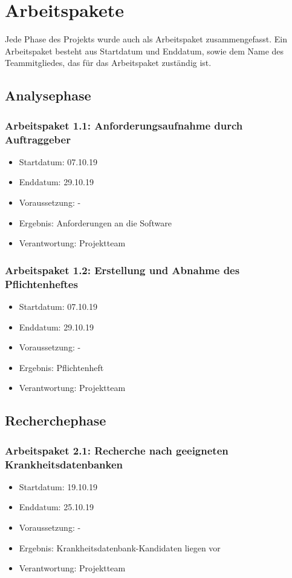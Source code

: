 \section*{Arbeitspakete}
Jede Phase des Projekts wurde auch als Arbeitspaket zusammengefasst. Ein Arbeitspaket besteht aus Startdatum und Enddatum, sowie dem Name des Teammitgliedes, das für das Arbeitspaket zuständig ist. 

\subsection*{Analysephase}
\subsubsection*{Arbeitspaket 1.1: Anforderungsaufnahme durch Auftraggeber}
\begin{itemize}
\item Startdatum: 07.10.19
\item Enddatum: 29.10.19
\item Voraussetzung: -
\item Ergebnis: Anforderungen an die Software
\item Verantwortung: Projektteam
\end{itemize}
\subsubsection*{Arbeitspaket 1.2: Erstellung und Abnahme des Pflichtenheftes}
\begin{itemize}
\item Startdatum: 07.10.19
\item Enddatum: 29.10.19
\item Voraussetzung: -
\item Ergebnis: Pflichtenheft
\item Verantwortung: Projektteam
\end{itemize}
\subsection*{Recherchephase}
\subsubsection*{Arbeitspaket 2.1: Recherche nach geeigneten Krankheitsdatenbanken}
\begin{itemize}
\item Startdatum: 19.10.19
\item Enddatum: 25.10.19
\item Voraussetzung: -
\item Ergebnis: Krankheitsdatenbank-Kandidaten liegen vor
\item Verantwortung: Projektteam
\end{itemize}

